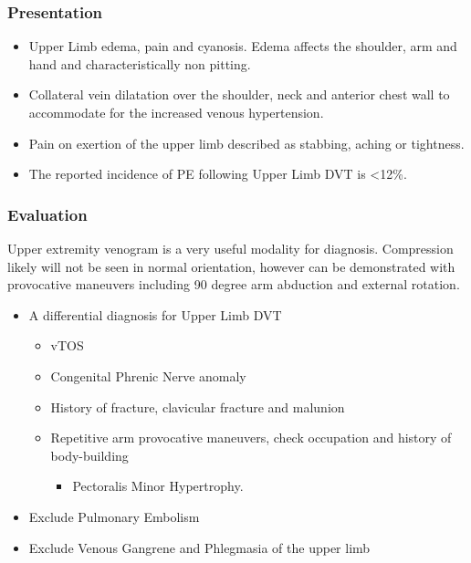 \documentclass[
]{book}
\providecommand{\tightlist}{%
  \setlength{\itemsep}{0pt}\setlength{\parskip}{0pt}}
\begin{document}
\hypertarget{presentation-6}{%
\subsubsection{Presentation}\label{presentation-6}}

\begin{itemize}
\item
  Upper Limb edema, pain and cyanosis. Edema affects the shoulder, arm
  and hand and characteristically non pitting.
\item
  Collateral vein dilatation over the shoulder, neck and anterior
  chest wall to accommodate for the increased venous hypertension.
  \citep{humphries123ThoracicOutlet2019}
\item
  Pain on exertion of the upper limb described as stabbing, aching or
  tightness.
\item
  The reported incidence of PE following Upper Limb DVT is \textless12\%.
  \citep{humphries123ThoracicOutlet2019}
\end{itemize}

\hypertarget{evaluation-10}{%
\subsubsection{Evaluation}\label{evaluation-10}}

Upper extremity venogram is a very useful modality for diagnosis.
Compression likely will not be seen in normal orientation, however can
be demonstrated with provocative maneuvers including 90 degree arm
abduction and external rotation.\citep{moriarty2015}

\begin{itemize}
\item
  A differential diagnosis for Upper Limb DVT

  \begin{itemize}
  \item
    vTOS
  \item
    Congenital Phrenic Nerve anomaly
  \item
    History of fracture, clavicular fracture and malunion
  \item
    Repetitive arm provocative maneuvers, check occupation and
    history of body-building

    \begin{itemize}
    \tightlist
    \item
      Pectoralis Minor Hypertrophy.
    \end{itemize}
  \end{itemize}
\item
  Exclude Pulmonary Embolism
\item
  Exclude Venous Gangrene and Phlegmasia of the upper limb
\end{itemize}
\end{document}
